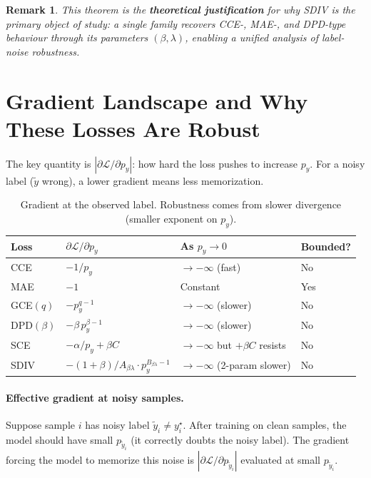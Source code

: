 \documentclass[11pt,a4paper]{article}
\newtheorem{remark}[theorem]{Remark}
\newcommand{\Lcal}{\mathcal{L}}
\newcommand{\abs}[1]{\left|#1\right|}
\newcommand{\py}{p_y}
\newcommand{\Bsd}{B_{\beta\lambda}}
\begin{document}
\begin{remark}
This theorem is the \textbf{theoretical justification} for why SDIV is the
primary object of study: a single family recovers CCE-, MAE-, and DPD-type behaviour
through its parameters $(\beta,\lambda)$, enabling a unified analysis of label-noise robustness.
\end{remark}

\section{Gradient Landscape and Why These Losses Are Robust}
\label{sec:gradients}

The key quantity is $\abs{\partial \Lcal / \partial \py}$: how hard the loss pushes
to increase $p_y$. For a noisy label ($\tilde y$ wrong), a lower gradient means
less memorization.

\begin{table}[h]
\centering\small
\begin{tabular}{@{}llll@{}}
\toprule
\textbf{Loss} & $\partial\Lcal/\partial p_y$ & \textbf{As $p_y \to 0$} & \textbf{Bounded?} \\
\midrule
CCE        & $-1/p_y$              & $\to -\infty$ (fast)   & No  \\
MAE        & $-1$                  & Constant               & Yes \\
GCE$(q)$   & $-p_y^{q-1}$         & $\to -\infty$ (slower) & No  \\
DPD$(\beta)$ & $-\beta\,p_y^{\beta-1}$ & $\to -\infty$ (slower) & No \\
SCE        & $-\alpha/p_y + \beta C$ & $\to -\infty$ but $+\beta C$ resists  & No \\
SDIV       & $-(1+\beta)/A_{\beta\lambda}\cdot p_y^{\Bsd-1}$ & $\to -\infty$ (2-param slower) & No \\
\bottomrule
\end{tabular}
\caption{Gradient at the observed label. Robustness comes from slower divergence
(smaller exponent on $p_y$).}
\label{tab:gradients}
\end{table}

\paragraph{Effective gradient at noisy samples.}
Suppose sample $i$ has noisy label $\tilde y_i \neq y_i^\star$.
After training on clean samples, the model should have small $p_{\tilde y_i}$
(it correctly doubts the noisy label). The gradient forcing the model to memorize this
noise is $\abs{\partial\Lcal/\partial p_{\tilde y_i}}$ evaluated at small $p_{\tilde y_i}$.
\end{document}
